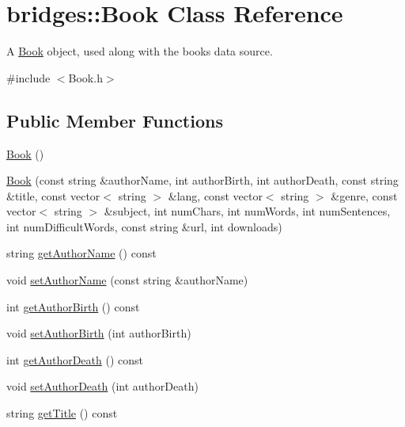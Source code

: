 \hypertarget{classbridges_1_1_book}{}\section{bridges\+::Book Class Reference}
\label{classbridges_1_1_book}


A \mbox{\hyperlink{classbridges_1_1_book}{Book}} object, used along with the books data source.  




{\ttfamily \#include $<$Book.\+h$>$}

\subsection*{Public Member Functions}
\begin{DoxyCompactItemize}
\item 
\mbox{\hyperlink{classbridges_1_1_book_abb2903c640bd263a2e077d52e12a773e}{Book}} ()
\item 
\mbox{\hyperlink{classbridges_1_1_book_a4256eb5015b42e511d950c45103cef63}{Book}} (const string \&author\+Name, int author\+Birth, int author\+Death, const string \&title, const vector$<$ string $>$ \&lang, const vector$<$ string $>$ \&genre, const vector$<$ string $>$ \&subject, int num\+Chars, int num\+Words, int num\+Sentences, int num\+Difficult\+Words, const string \&url, int downloads)
\item 
string \mbox{\hyperlink{classbridges_1_1_book_a1f25d71b565a1bf5c82f76cce5dcc537}{get\+Author\+Name}} () const
\item 
void \mbox{\hyperlink{classbridges_1_1_book_a4ca756815b519a0a4d1ae5d3b21aa2d2}{set\+Author\+Name}} (const string \&author\+Name)
\item 
int \mbox{\hyperlink{classbridges_1_1_book_ac2c02b94f40eaddc7a2cca3f90976093}{get\+Author\+Birth}} () const
\item 
void \mbox{\hyperlink{classbridges_1_1_book_adca4d6766fa0068e23926ae95ed8411f}{set\+Author\+Birth}} (int author\+Birth)
\item 
int \mbox{\hyperlink{classbridges_1_1_book_a449e48d10878833b2f983deb993124dc}{get\+Author\+Death}} () const
\item 
void \mbox{\hyperlink{classbridges_1_1_book_a044ad1b1b6418d7545c6f957b2757bcd}{set\+Author\+Death}} (int author\+Death)
\item 
string \mbox{\hyperlink{classbridges_1_1_book_a5eda2e13c3b5523498d42845219eb175}{get\+Title}} () const
\item 

\end{DoxyCompactItemize}
